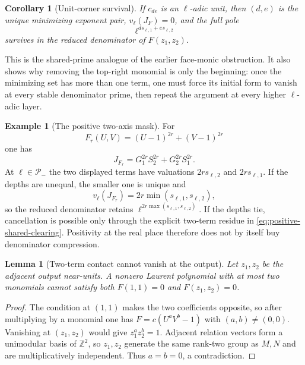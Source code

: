 \documentclass[11pt,oneside]{article}
\newtheorem{lemma}[theorem]{Lemma}
\newtheorem{corollary}[theorem]{Corollary}
\theoremstyle{definition}
\newtheorem{example}[theorem]{Example}
\theoremstyle{remark}
\newcommand{\Z}{\mathbb Z}
\begin{document}
\begin{corollary}[Unit-corner survival]
\label{cor:unit-corner-survival}
If $c_{de}$ is an $\ell$-adic unit, then $(d,e)$ is the unique minimizing exponent pair,
$v_\ell(J_F)=0$, and the full pole
\begin{equation}
 \ell^{d s_{\ell,1}+e s_{\ell,2}}
 \label{eq:full-shared-pole}
\end{equation}
survives in the reduced denominator of $F(z_1,z_2)$.
\end{corollary}

This is the shared-prime analogue of the earlier face-monic obstruction.  It also shows why
removing the top-right monomial is only the beginning: once the minimizing set has more than
one term, one must force its initial form to vanish at every stable denominator prime, then
repeat the argument at every higher $\ell$-adic layer.

\begin{example}[The positive two-axis mask]
\label{ex:positive-shared-mask}
For
\[
 F_r(U,V)=(U-1)^{2r}+(V-1)^{2r}
\]
one has
\begin{equation}
 J_{F_r}=G_1^{2r}S_2^{2r}+G_2^{2r}S_1^{2r}.
 \label{eq:positive-shared-clearing}
\end{equation}
At $\ell\in\mathcal P_-$ the two displayed terms have valuations
$2rs_{\ell,2}$ and $2rs_{\ell,1}$.  If the depths are unequal, the smaller one is unique and
\begin{equation}
 v_\ell(J_{F_r})=2r\min(s_{\ell,1},s_{\ell,2}),
 \label{eq:positive-shared-exact}
\end{equation}
so the reduced denominator retains
$\ell^{2r\max(s_{\ell,1},s_{\ell,2})}$.  If the depths tie, cancellation is possible only
through the explicit two-term residue in \eqref{eq:positive-shared-clearing}.  Positivity at
the real place therefore does not by itself buy denominator compression.
\end{example}

\begin{lemma}[Two-term contact cannot vanish at the output]
\label{lem:balanced-binomial-collapse}
Let $z_1,z_2$ be the adjacent output near-units.  A nonzero Laurent polynomial with at most
two monomials cannot satisfy both $F(1,1)=0$ and $F(z_1,z_2)=0$.
\end{lemma}

\begin{proof}
The condition at $(1,1)$ makes the two coefficients opposite, so after multiplying by a
monomial one has $F=c(U^aV^b-1)$ with $(a,b)\ne(0,0)$.  Vanishing at $(z_1,z_2)$ would give
$z_1^az_2^b=1$.  Adjacent relation vectors form a unimodular basis of $\Z^2$, so
$z_1,z_2$ generate the same rank-two group as $M,N$ and are multiplicatively independent.
Thus $a=b=0$, a contradiction.
\end{proof}
\end{document}
